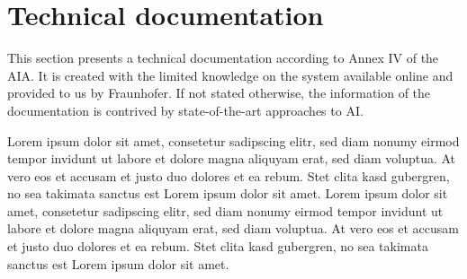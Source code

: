 \section{Technical documentation}
  This section presents a technical documentation according to Annex IV of the AIA.\@
  It is created with the limited knowledge on the system available online and provided to us by Fraunhofer. If not stated otherwise, 
  the information of the documentation is contrived by state-of-the-art approaches to AI.\@

  \medskip

  Lorem ipsum dolor sit amet, consetetur sadipscing elitr, 
  sed diam nonumy eirmod tempor invidunt ut labore et dolore 
  magna aliquyam erat, sed diam voluptua. At vero eos et accusam 
  et justo duo dolores et ea rebum. Stet clita kasd gubergren, 
  no sea takimata sanctus est Lorem ipsum dolor sit amet. 
  Lorem ipsum dolor sit amet, consetetur sadipscing elitr, 
  sed diam nonumy eirmod tempor invidunt ut labore et 
  dolore magna aliquyam erat, sed diam voluptua. At vero 
  eos et accusam et justo duo dolores et ea rebum. Stet 
  clita kasd gubergren, no sea takimata sanctus est 
  Lorem ipsum dolor sit amet.\cite{puppy}
  

